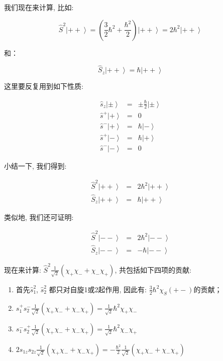我们现在来计算, 比如:

\begin{equation*}
\hat S^2 \left| ++ \right\rangle = \left( \frac{3}{2}\hbar^2 +
\frac{\hbar^2}{2} \right) \left| ++ \right\rangle = 2\hbar^2 \left|
++ \right\rangle
\end{equation*}

和：

\begin{equation*}
\hat S_z \left| ++ \right\rangle = \hbar \left| ++ \right\rangle
\end{equation*}

这里要反复用到如下性质:

\begin{eqnarray*}
  \hat s_z \left| \pm \right\rangle &=& \pm \frac{\hbar}{2} \left| \pm \right\rangle \\
  \hat s^+ \left| {+} \right\rangle &=& 0 \\
  \hat s^- \left| {+} \right\rangle &=& \hbar \left| {-}
  \right\rangle \\
  \hat s^+ \left| {-} \right\rangle &=& \hbar \left| {+} \right\rangle \\
  \hat s^- \left| {-} \right\rangle &=& 0
\end{eqnarray*}

小结一下, 我们得到:

\begin{eqnarray*}
 \hat S^2 \left| ++ \right\rangle &=& 2 \hbar^2 \left| ++ \right\rangle \\
 \hat S_z \left| ++ \right\rangle &=& \hbar \left| ++ \right\rangle
\end{eqnarray*}

类似地, 我们还可证明:

\begin{eqnarray*}
 \hat S^2 \left| -- \right\rangle &=& 2 \hbar^2 \left| -- \right\rangle \\
 \hat S_z \left| -- \right\rangle &=& - \hbar \left| -- \right\rangle
\end{eqnarray*}

现在来计算: $\hat S^2 \frac{1}{\sqrt 2}\left( \chi_+ \chi_- + \chi_-
\chi_+ \right)$, 共包括如下四项的贡献:

\begin{enumerate}
  \item 首先$\hat s_1^2$, $\hat s_2^2$ 都只对自旋1或2起作用, 因此有:
$\frac{3}{2}\hbar^2 \chi_S(+-)$的贡献；
  \item $s_1^+ s_2^- \frac{1}{\sqrt 2}\left( \chi_+ \chi_- + \chi_-
\chi_+ \right) = \frac{1}{\sqrt 2} \hbar^2 \chi_+\chi_-$
  \item $s_1^- s_2^+ \frac{1}{\sqrt 2}\left( \chi_+ \chi_- + \chi_-
\chi_+ \right) = \frac{1}{\sqrt 2} \hbar^2 \chi_-\chi_+$
  \item $2s_{1z}s_{2z} \frac{1}{\sqrt 2}\left( \chi_+ \chi_- + \chi_-
\chi_+ \right) = - \frac{\hbar^2}{2} \frac{1}{\sqrt 2}\left(
\chi_+\chi_- + \chi_-\chi_+ \right)$
\end{enumerate}

